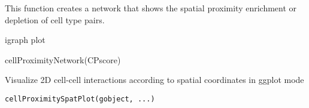 \documentclass[a4paper]{book}
\begin{document}
%
\begin{Details}\relax
This function creates a network that shows the  spatial proximity
enrichment or depletion of cell type pairs.
\end{Details}
%
\begin{Value}
igraph plot
\end{Value}
%
\begin{Examples}
\begin{ExampleCode}
    cellProximityNetwork(CPscore)
\end{ExampleCode}
\end{Examples}
%
\begin{Description}\relax
Visualize 2D cell-cell interactions according to spatial coordinates in ggplot mode
\end{Description}
%
\begin{Usage}
\begin{verbatim}
cellProximitySpatPlot(gobject, ...)
\end{verbatim}
\end{Usage}
%
\end{document}
